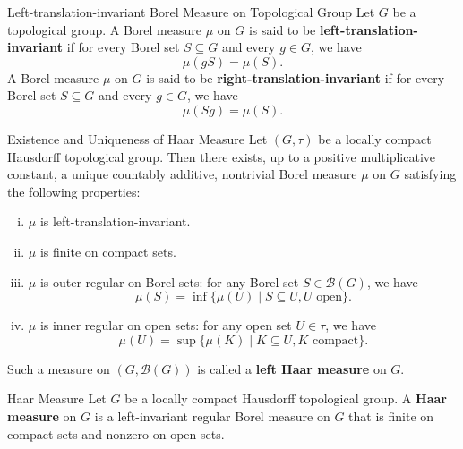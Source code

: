 \documentclass{report}
\begin{document}
\begin{definition}{Left-translation-invariant Borel Measure on Topological Group}{}
	Let $G$ be a topological group. A Borel measure $\mu$ on $G$ is said to be \textbf{left-translation-invariant} if for every Borel set $S\subseteq G$ and every $g \in G$, we have
	$$
		\mu(g S)=\mu(S).
	$$
	A Borel measure $\mu$ on $G$ is said to be \textbf{right-translation-invariant} if for every Borel set $S \subseteq G$ and every $g \in G$, we have
	$$
		\mu(S g)=\mu(S).
	$$
\end{definition}

\begin{theorem}{Existence and Uniqueness of Haar Measure}{}
	Let $(G,\tau)$ be a locally compact Hausdorff topological group. Then there exists, up to a positive multiplicative constant, a unique countably additive, nontrivial Borel measure $\mu$ on $G$ satisfying the following properties:
	\begin{enumerate}[(i)]
		\item $\mu$ is left-translation-invariant.
		\item $\mu$ is finite on compact sets.
		\item $\mu$ is outer regular on Borel sets: for any Borel set $S \in \mathcal{B}(G)$, we have
		      $$
		      \mu(S)=\inf \{\mu(U) \mid S \subseteq U, U \text { open}\}.
		      $$
		\item $\mu$ is inner regular on open sets: for any open set $U \in \tau$, we have
		\[
			\mu(U)=\sup \{\mu(K) \mid K \subseteq U, K \text { compact}\}.
		\]
	\end{enumerate}
	Such a measure on $(G, \mathcal{B}(G))$ is called a \textbf{left Haar measure} on $G$.
\end{theorem}

\begin{definition}{Haar Measure}{}
	Let $G$ be a locally compact Hausdorff topological group.
	A \textbf{Haar measure} on $G$ is a left-invariant regular Borel measure on $G$ that is finite on compact sets and nonzero on open sets.
\end{definition}
\end{document}
